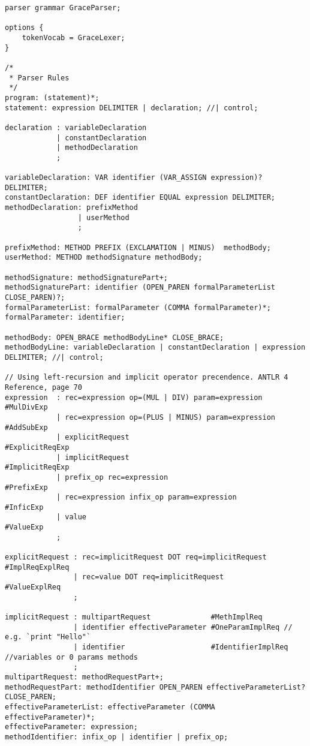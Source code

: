 \begin{verbatim}
parser grammar GraceParser;

options {
    tokenVocab = GraceLexer;
}

/*
 * Parser Rules
 */
program: (statement)*;
statement: expression DELIMITER | declaration; //| control;

declaration : variableDeclaration
            | constantDeclaration
            | methodDeclaration
            ;

variableDeclaration: VAR identifier (VAR_ASSIGN expression)? DELIMITER;
constantDeclaration: DEF identifier EQUAL expression DELIMITER;
methodDeclaration: prefixMethod
                 | userMethod
                 ;

prefixMethod: METHOD PREFIX (EXCLAMATION | MINUS)  methodBody;
userMethod: METHOD methodSignature methodBody;

methodSignature: methodSignaturePart+;
methodSignaturePart: identifier (OPEN_PAREN formalParameterList CLOSE_PAREN)?;
formalParameterList: formalParameter (COMMA formalParameter)*;
formalParameter: identifier;

methodBody: OPEN_BRACE methodBodyLine* CLOSE_BRACE;
methodBodyLine: variableDeclaration | constantDeclaration | expression DELIMITER; //| control;

// Using left-recursion and implicit operator precendence. ANTLR 4 Reference, page 70
expression  : rec=expression op=(MUL | DIV) param=expression        #MulDivExp
            | rec=expression op=(PLUS | MINUS) param=expression     #AddSubExp
            | explicitRequest                                       #ExplicitReqExp
            | implicitRequest                                       #ImplicitReqExp
            | prefix_op rec=expression                              #PrefixExp
            | rec=expression infix_op param=expression              #InficExp
            | value                                                 #ValueExp
            ;

explicitRequest : rec=implicitRequest DOT req=implicitRequest #ImplReqExplReq
                | rec=value DOT req=implicitRequest           #ValueExplReq
                ;

implicitRequest : multipartRequest              #MethImplReq
                | identifier effectiveParameter #OneParamImplReq // e.g. `print "Hello"`
                | identifier                    #IdentifierImplReq //variables or 0 params methods
                ;
multipartRequest: methodRequestPart+;
methodRequestPart: methodIdentifier OPEN_PAREN effectiveParameterList? CLOSE_PAREN;
effectiveParameterList: effectiveParameter (COMMA effectiveParameter)*;
effectiveParameter: expression;
methodIdentifier: infix_op | identifier | prefix_op;


\end{verbatim}
